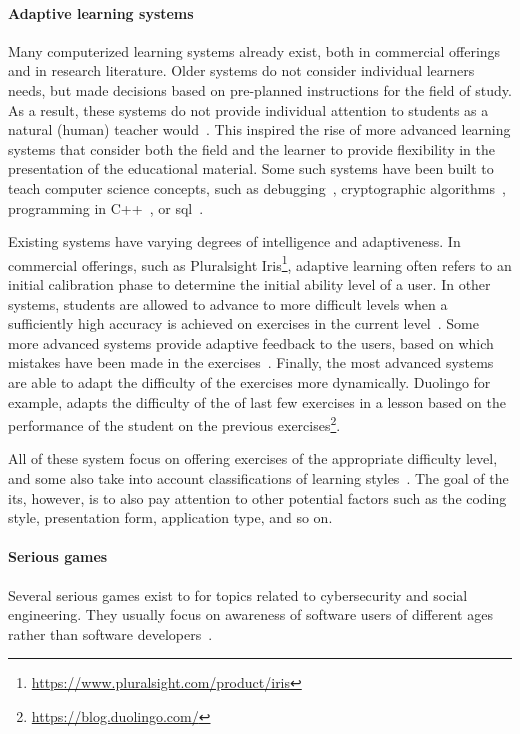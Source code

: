 \paragraph{Adaptive learning systems}
Many computerized learning systems already exist, both in commercial offerings and in research literature.
Older systems do not consider individual learners needs, but made decisions based on pre-planned instructions for the field of study.
As a result, these systems do not provide individual attention to students as a natural (human) teacher would~\cite{mahdi2016intelligent}.
This inspired the rise of more advanced learning systems that consider both the field and the learner to provide flexibility in the presentation of the educational material.
Some such systems have been built to teach computer science concepts, such as debugging~\cite{carter2013tutoring}, cryptographic algorithms~\cite{abuel2018intelligent,mahdi2016intelligent}, programming in C++~\cite{abu2009evaluating}, or \gls{sql}~\cite{mitrovic2003intelligent}.

Existing systems have varying degrees of intelligence and adaptiveness.
In commercial offerings, such as Pluralsight Iris\footnote{\url{https://www.pluralsight.com/product/iris}}, adaptive learning often refers to an initial calibration phase to determine the initial ability level of a user.
In other systems, students are allowed to advance to more difficult levels when a sufficiently high accuracy is achieved on exercises in the current level~\cite{abu2009evaluating,mahdi2016intelligent}.
Some more advanced systems provide adaptive feedback to the users, based on which mistakes have been made in the exercises~\cite{carter2013tutoring,abuel2018intelligent}.
Finally, the most advanced systems are able to adapt the difficulty of the exercises more dynamically.
Duolingo for example, adapts the difficulty of the of last few exercises in a lesson based on the performance of the student on the previous exercises\footnote{\url{https://blog.duolingo.com/}}.

All of these system focus on offering exercises of the appropriate difficulty level, and some also take into account classifications of learning styles~\cite{alshammari2015design,felder1988learning}.
The goal of the \gls{its}, however, is to also pay attention to other potential factors such as the coding style, presentation form, application type, and so on.

\paragraph{Serious games}
Several serious games exist to for topics related to cybersecurity and social engineering.
They usually focus on awareness of software users of different ages rather than software developers~\cite{giannakas2015cyberaware,jin2018evaluation,beckers2016serious,yasin2018design}.


